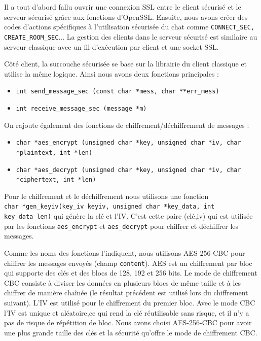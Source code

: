 \documentclass[a4paper,11pt,french]{book}
\begin{document}
Il a tout d'abord fallu ouvrir une connexion SSL entre le client sécurisé et le serveur sécurisé grâce aux fonctions d'OpenSSL. Ensuite, nous avons créer des codes d'actions spécifiques à l'utilisation sécurisée du chat comme \verb+CONNECT_SEC, CREATE_ROOM_SEC+... La gestion des clients dans le serveur sécurisé est similaire au serveur classique avec un fil d'exécution par client et une socket SSL.

Côté client, la surcouche sécurisée se base sur la librairie du client classique et utilise la même logique. Ainsi nous avons deux fonctions principales : 
\begin{itemize}
\item \verb+int send_message_sec (const char *mess, char **err_mess)+
\item \verb+int receive_message_sec (message *m)+
\end{itemize}

On rajoute également des fonctions de chiffrement/déchiffrement de messages :
\small{
\begin{itemize}
\item \verb+char *aes_encrypt (unsigned char *key, unsigned char *iv, char *plaintext, int *len)+

\item \verb+char *aes_decrypt (unsigned char *key, unsigned char *iv, char *ciphertext, int *len)+
\end{itemize}
}

Pour le chiffrement et le déchiffrement nous utilisons une fonction \\
 \verb+char *gen_keyiv(key_iv keyiv, unsigned char *key_data, int key_data_len)+ 
 qui génère la clé et l'IV. C'est cette paire (clé,iv) qui est utilisée par les fonctions \verb+aes_encrypt+ et \verb+aes_decrypt+ pour chiffrer et déchiffrer les messages.

Comme les noms des fonctions l'indiquent, nous utilisons AES-256-CBC pour chiffrer les messages envoyés (champ \verb+content+). AES est un chiffrement par bloc qui supporte des clés et des blocs de 128, 192 et 256 bits. Le mode de chiffrement CBC consiste à diviser les données en plusieurs blocs de même taille et à les chiffrer de manière chaînée (le résultat précédent est utilisé lors du chiffrement suivant). L'IV est utilisé pour le chiffrement du premier bloc. Avec le mode CBC l'IV est unique et aléatoire,ce qui rend la clé réutilisable sans risque, et il n'y a pas de risque de répétition de bloc. Nous avons choisi AES-256-CBC pour avoir une plus grande taille des clés et la sécurité qu'offre le mode de chiffrement CBC. 
\end{document}
